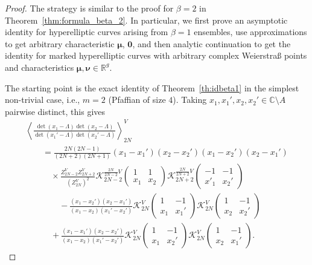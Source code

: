 \documentclass[pdftex]{sigma}
\numberwithin{equation}{section}
\newcommand{\mean}[1]{\left\langle{#1}\right\rangle}
\begin{document}
\begin{proof}
 The strategy is similar to the proof for $\beta = 2$ in Theorem~\ref{thm:formula_beta_2}. In particular, we first prove an asymptotic identity for hyperelliptic curves arising from $\beta = 1$ ensembles, use approximations to get arbitrary characteristic $\bm{\mu}$, $\bm{0}$, and then analytic continuation to get the identity for marked hyperelliptic curves with arbitrary complex Weierstra\ss{} points and characteristics $\bm{\mu},\bm{\nu} \in \mathbb{R}^g$.

The starting point is the exact identity of Theorem~\ref{th:idbeta1} in the simplest
 non-trivial case, i.e., $m = 2$ (Pfaffian of size $4$). Taking $x_1,x_1',x_2,x_2' \in \mathbb{C} \setminus A$ pairwise distinct, this gives
 \begin{gather}
	  \mean{\frac{\det(x_1- \Lambda)\det(x_2- \Lambda)}{\det(x_1'- \Lambda)\det(x_2'- \Lambda)}}_{2N}^{V} \nonumber\\
	\qquad {}  = \frac{2N(2N - 1)}{(2N + 2)(2N + 1)} (x_1- x_1')(x_2- x_2')(x_1- x_2')(x_2- x_1') \nonumber\\
\qquad \quad{}\times\frac{Z_{2N - 2}^{V}Z_{2N + 2}^{V}}{(Z_{2N}^{V})^2} \mathcal{K}_{2N - 2}^{\frac{2N}{2N - 2}V}\left(\begin{matrix} 1 & 1 \\ x_1& x_2\end{matrix}\right)\mathcal{K}_{2N + 2}^{\frac{2N}{2N + 2}V}\left(\begin{matrix} -1 & -1 \\ x'_1& x_2'\end{matrix}\right) \nonumber\\
\qquad\qquad{}	 - \frac{(x_1- x_2')(x_2- x_1')}{(x_1- x_2)(x_1'- x_2')} \mathcal{K}_{2N}^V\left(\begin{matrix} 1 & -1 \\ x_1& x_1'\end{matrix}\right)\mathcal{K}_{2N}^{V}\left(\begin{matrix} 1 & -1 \\ x_2& x_2'\end{matrix}\right) \nonumber\\
\qquad\quad{}+ \frac{(x_1- x_1')(x_2- x_2')}{(x_1- x_2)(x_1'- x_2')}\mathcal{K}_{2N}^{V}\left(\begin{matrix} 1 & -1 \\ x_1& x_2'\end{matrix}\right)\mathcal{K}_{2N}^{V}\left(\begin{matrix} 1 & -1 \\ x_2& x_1'\end{matrix}\right). \label{beta1un}

\end{gather}
\end{proof}
\end{document}
